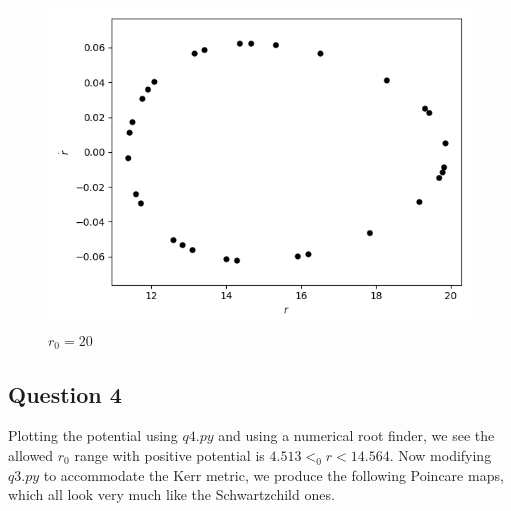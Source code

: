 \documentclass[10pt,a4paper]{report}
\begin{document}
\begin{figure}[!ht]
\begin{minipage}[b]{0.5\linewidth}
\centering
\includegraphics[width=\textwidth]{3b/r0=20,E=0.97,L=4.png}
\caption{$r_0=20$}
\label{fig:figure1}
\end{minipage}
\end{figure}



\newpage

\subsection*{Question 4}

Plotting the potential using $q4.py$ and using a numerical root finder, we see the allowed $r_0$ range with positive potential is $4.513<_0r<14.564$. Now modifying $q3.py$ to accommodate the Kerr metric, we produce the following Poincare maps, which all look very much like the Schwartzchild ones.
\end{document}
